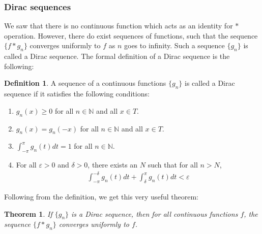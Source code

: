 \documentclass[12pt, titlepage]{article}
\newtheorem{thm}{Theorem}[section]
\theoremstyle{definition}
\newtheorem{defn}{Definition}[section]
\newcommand{\vep}{\varepsilon}
\begin{document}
\subsubsection{Dirac sequences}
We saw that there is no continuous function which acts as an identity for $\ast$ operation. However, there do exist sequences of functions, such that the sequence $\{f \ast g_n\}$ converges uniformly to $f$ as $n$ goes to infinity. Such a sequence $\{g_n\}$ is called a Dirac sequence. The formal definition of a Dirac sequence is the following:
\begin{defn}
    A sequence of a continuous functions $\{g_n\}$ is called a Dirac sequence if it satisfies the following conditions:
    \begin{enumerate}
        \item $g_n(x) \geq 0$ for all $n \in \mathbb{N}$ and all $x \in T$.
        \item $g_n(x) = g_n(-x)$ for all $n \in \mathbb{N}$ and all $x \in T$.
        \item $\displaystyle \int_{-\pi}^{\pi} g_n(t) dt = 1$ for all $n \in \mathbb{N}$.
        \item For all $\vep >0$ and $\delta > 0$, there exists an $N$ such that for all $n > N$,
        \begin{align*}
            \int_{-\pi}^{-\delta} g_n(t) dt + \int_{\delta}^{\pi} g_n(t) dt < \vep
        \end{align*}
    \end{enumerate}
\end{defn}
Following from the definition, we get this very useful theorem:
\begin{thm}\label{th:1}
    If $\{g_n\}$ is a Dirac sequence, then for all continuous functions $f$, the sequence $\{f \ast g_n\}$ converges uniformly to $f$.
\end{thm}
\end{document}
